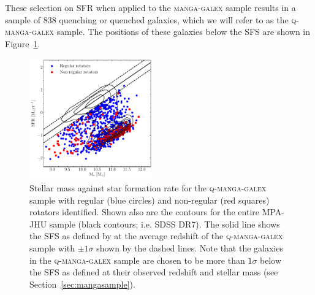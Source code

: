 \documentclass[useAMS,usenatbib]{mn2e}
\begin{document}

These selection on SFR when applied to the \textsc{manga-galex} sample results in a sample of $838$ quenching or quenched galaxies, which we will refer to as the \textsc{q-manga-galex} sample. The positions of these galaxies below the SFS are shown in Figure~\ref{fig:masvsfr}. 

\begin{figure}
\centering
\includegraphics[width=0.475\textwidth]{../figures/nonSF_FR_SR_SFS_scatter.pdf}
\caption{Stellar mass against star formation rate for the \textsc{q-manga-galex} sample with regular (blue circles) and non-regular (red squares) rotators identified. Shown also are the contours for the entire MPA-JHU sample (black contours; i.e. SDSS DR7). The solid line shows the SFS as defined by \cite{peng10} at the average redshift of the \textsc{q-manga-galex} sample with $\pm 1 \sigma$ shown by the dashed lines. Note that the galaxies in the \textsc{q-manga-galex} sample are chosen to be more than $1\sigma$ below the SFS as defined at their observed redshift and stellar mass (see Section~\ref{sec:mangasample}).}
\label{fig:masvsfr}
\end{figure}
\end{document}

